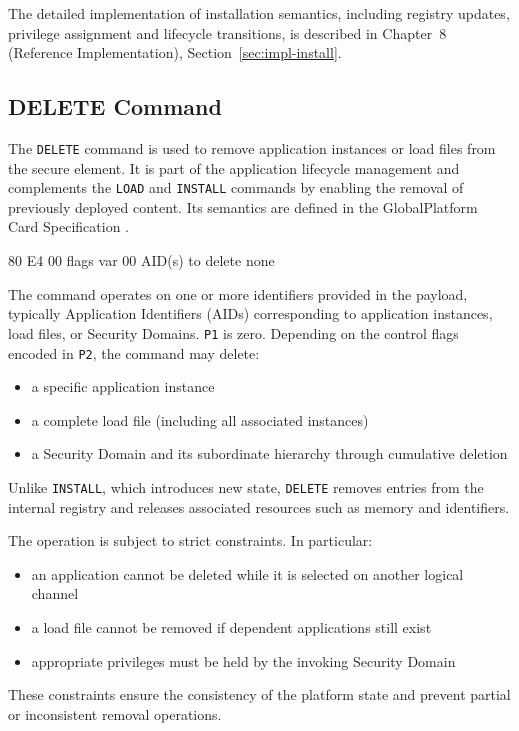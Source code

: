 The detailed implementation of installation semantics, including registry
updates, privilege assignment and lifecycle transitions, is described in
Chapter~8 (Reference Implementation), Section~\ref{sec:impl-install}.

\subsection{DELETE Command}

The \texttt{DELETE} command is used to remove application instances or load
files from the secure element. It is part of the application lifecycle management and
complements the \texttt{LOAD} and \texttt{INSTALL} commands by enabling the
removal of previously deployed content. Its semantics are defined in the
GlobalPlatform Card Specification .

\apdudesc
{80}
{E4}
{00}
{flags}
{var}
{00}
{AID(s) to delete}
{none}

The command operates on one or more identifiers provided in the payload,
typically Application Identifiers (AIDs) corresponding to application instances,
load files, or Security Domains. \texttt{P1} is zero. Depending on the control
flags encoded in \texttt{P2}, the command may delete:
\begin{itemize}
\item a specific application instance
\item a complete load file (including all associated instances)
\item a Security Domain and its subordinate hierarchy through cumulative deletion
\end{itemize}

Unlike \texttt{INSTALL}, which introduces new state, \texttt{DELETE} removes
entries from the internal registry and releases associated resources such as
memory and identifiers.

The operation is subject to strict constraints. In particular:
\begin{itemize}
\item an application cannot be deleted while it is selected on another
      logical channel
\item a load file cannot be removed if dependent applications still exist
\item appropriate privileges must be held by the invoking Security Domain
\end{itemize}

These constraints ensure the consistency of the platform state and prevent
partial or inconsistent removal operations.

